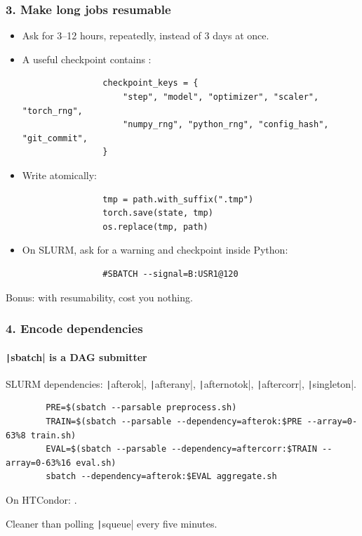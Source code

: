 \documentclass[10pt,aspectratio=169,notheorems]{beamer}
\begin{document}
\begin{frame}[fragile]
    \frametitle{3. Make long jobs resumable}

    \begin{itemize}
        \item Ask for 3--12 hours, repeatedly, instead of 3 days at once.
        \item A useful checkpoint contains :
            \begin{verbatim}
                checkpoint_keys = {
                    "step", "model", "optimizer", "scaler", "torch_rng",
                    "numpy_rng", "python_rng", "config_hash", "git_commit",
                }
            \end{verbatim}
        \item Write atomically:
            \begin{verbatim}
                tmp = path.with_suffix(".tmp")
                torch.save(state, tmp)
                os.replace(tmp, path)
            \end{verbatim}
        \item On SLURM, ask for a warning and checkpoint inside Python:
            \begin{verbatim}
                #SBATCH --signal=B:USR1@120
            \end{verbatim}
    \end{itemize}

    \vspace{0.1em}
    \textcolor{SlidemintMuted}{Bonus: with resumability,  cost you nothing.}
\end{frame}

\begin{frame}[fragile]
    \frametitle{4. Encode dependencies}
    \framesubtitle{\texttt|sbatch| is a DAG submitter}
    SLURM dependencies: \texttt|afterok|, \texttt|afterany|, \texttt|afternotok|, \texttt|aftercorr|, \texttt|singleton|.

    \vspace{0.4em}
    \begin{verbatim}
        PRE=$(sbatch --parsable preprocess.sh)
        TRAIN=$(sbatch --parsable --dependency=afterok:$PRE --array=0-63%8 train.sh)
        EVAL=$(sbatch --parsable --dependency=aftercorr:$TRAIN --array=0-63%16 eval.sh)
        sbatch --dependency=afterok:$EVAL aggregate.sh
    \end{verbatim}

    \vspace{0.4em}
    On HTCondor: .

    \vspace{2em}
    \textcolor{SlidemintMuted}{Cleaner than polling \texttt|squeue| every five minutes.}
\end{frame}
\end{document}
